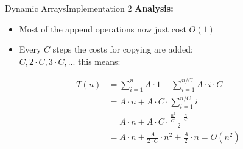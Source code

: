 \begin{frame}{Dynamic Arrays}{Implementation 2}
  \textbf{Analysis:}
  \begin{itemize}
    \item
     Most of the append operations now just cost $O(1)$
    \item
      Every $C$ steps the costs for copying are added:\\
      $C, 2 \cdot C,3 \cdot C, ...$ this means:
  \end{itemize}
  \begin{align*}
    T(n) &= \sum_{i=1}^n A \cdot 1 + \sum_{i=1}^{n/C} A \cdot i \cdot C\\
    &= A \cdot n + A \cdot C \cdot \sum_{i=1}^{n/C} i\\
    &= A \cdot n + A \cdot C \cdot \frac{\frac{n^2}{C^2} + \frac{n}{C}}{2}\\
    &= A \cdot n + \frac{A}{2 \cdot C} \cdot n^{2} + \frac{A}{2} \cdot n = O(n^2)
  \end{align*}  
\end{frame}


